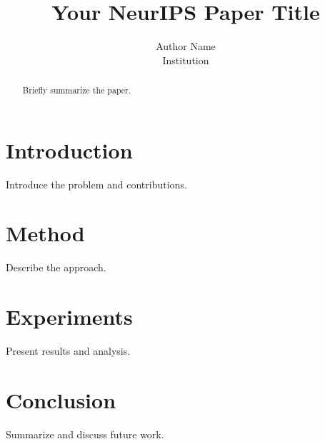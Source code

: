 \documentclass[11pt]{article} %
\title{Your NeurIPS Paper Title}
\author{Author Name \\ Institution}
\begin{document}
\maketitle

\begin{abstract}
Briefly summarize the paper.
\end{abstract}

\section{Introduction}
Introduce the problem and contributions.

\section{Method}
Describe the approach.

\section{Experiments}
Present results and analysis.

\section{Conclusion}
Summarize and discuss future work.

\printbibliography
\end{document}
